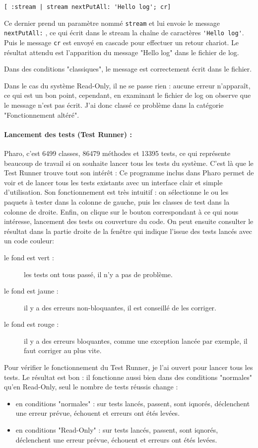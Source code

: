 \begin{verbatim}
[ :stream | stream nextPutAll: 'Hello log'; cr]
\end{verbatim}

Ce dernier prend un paramètre nommé \verb$stream$ et lui envoie le message \verb$nextPutAll:$ , ce qui écrit dans le stream la chaîne de caractères \verb$'Hello log'$. Puis le message \verb$cr$ est envoyé en cascade pour effectuer un retour chariot. Le résultat attendu est l'apparition du message "Hello log" dans le fichier de log.

Dans des conditions "classiques", le message est correctement écrit dans le fichier.

Dans le cas du système Read-Only, il ne se passe rien : aucune erreur n'apparaît, ce qui est un bon point, cependant, en examinant le fichier de log on observe que le message n'est pas écrit. J'ai donc classé ce problème dans la catégorie "Fonctionnement altéré".

\paragraph{Lancement des tests (Test Runner) :}
Pharo, c'est 6499 classes, 86479 méthodes et 13395 tests, ce qui représente beaucoup de travail si on souhaite lancer tous les tests du système. C'est là que le Test Runner trouve tout son intérêt : Ce programme inclus dans Pharo permet de voir et de lancer tous les tests existants avec un interface clair et simple d'utilisation. Son fonctionnement est très intuitif : on sélectionne le ou les paquets à tester dans la colonne de gauche, puis les classes de test dans la colonne de droite. Enfin, on clique sur le bouton correspondant à ce qui nous intéresse, lancement des tests ou couverture du code. On peut ensuite consulter le résultat dans la partie droite de la fenêtre qui indique l'issue des tests lancés avec un code couleur:
\begin{description}
	\item[le fond est vert :] les tests ont tous passé, il n'y a pas de problème.
	\item[le fond est jaune :] il y a des erreurs non-bloquantes, il est conseillé de les corriger.
	\item[le fond est rouge :] il y a des erreurs bloquantes, comme une exception lancée par exemple, il faut corriger au plus vite.
\end{description}

Pour vérifier le fonctionnement du Test Runner, je l'ai ouvert pour lancer tous les tests. Le résultat est bon : il fonctionne aussi bien dans des conditions "normales" qu'en Read-Only, seul le nombre de tests réussis change :
\begin{itemize}
	\item en conditions "normales" : sur  tests lancés,  passent,  sont iqnorés,  déclenchent une erreur prévue,  échouent et  erreurs ont étés levées.
	\item en conditions "Read-Only" : sur  tests lancés,  passent,  sont iqnorés,  déclenchent une erreur prévue,  échouent et  erreurs ont étés levées.
\end{itemize}

